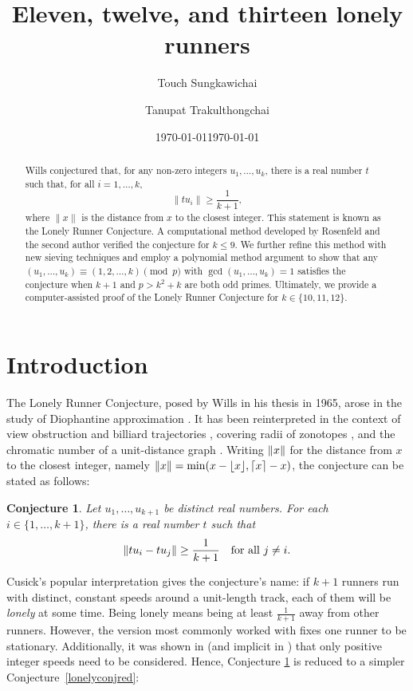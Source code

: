 \documentclass[11pt]{amsart}
\title{Eleven, twelve, and thirteen lonely runners}
\author[T. Sungkawichai]{Touch Sungkawichai}
\date{\today}
\author[T. Trakulthongchai]{Tanupat Trakulthongchai}
\date{\today}
\DeclarePairedDelimiter\norm{\lVert}{\rVert}
\newtheorem{conjecture}[theorem]{Conjecture}
\theoremstyle{definition}
\theoremstyle{remark}
\begin{document}
\begin{abstract}
    Wills conjectured that, for any non-zero integers $u_1,\ldots,u_k$, 
    there is a real number $t$ such that, for all $i=1,\ldots,k$, \[\lVert tu_i\rVert\geq\frac{1}{k+1},\] 
    where $\lVert x\rVert$ is the distance from $x$ to the closest integer. This statement is known as the Lonely Runner Conjecture.
    A computational method developed by Rosenfeld and the second author verified the conjecture for $k\leq9$.
    We further refine this method with new sieving techniques and employ a polynomial method argument to show that
    any $(u_1,\ldots,u_k)\equiv(1,2,\ldots,k)\pmod{p}$ with $\gcd(u_1,\ldots,u_k)=1$ satisfies the conjecture when $k+1$ and $p > k^2+k$ 
    are both odd primes. Ultimately, we provide a computer-assisted proof of the Lonely Runner Conjecture for $k\in\{10,11,12\}$.
\end{abstract}
\maketitle

\section{Introduction}
The Lonely Runner Conjecture, posed by Wills in his thesis \cite{wills1965zwei} in 1965, arose in the study of Diophantine approximation \cite{Wills}. It has been reinterpreted in the context of view obstruction and billiard trajectories 
\cite{cusick1984view}, covering radii of zonotopes \cite{henze_covering_2017}, and the chromatic number of a 
unit-distance graph \cite{zhu2002circular}. 
Writing $\norm{x}$ for the distance from $x$ to the closest integer, namely $\norm{x}=\min(x-\lfloor x\rfloor, \lceil x\rceil-x)$, 
the conjecture can be stated as follows:

\begin{conjecture} \label{lonelyconj}
  Let $u_1, \ldots,u_{k+1}$ be distinct real numbers. For each $i \in\{1,\ldots,k+1\}$, there is a real number $t$ such that
  \[ \norm{t u_i-tu_j} \ge \frac{1}{k+1} \quad \text{for all } j \ne i. \]
\end{conjecture}

Cusick's \cite{bienia1998flows} popular interpretation gives the conjecture's name: if $k+1$ runners run with distinct,
constant speeds around a unit-length track, each of them will be \emph{lonely} at some time. 
Being lonely means being at least $\tfrac{1}{k+1}$ away from other runners. 
However, the version most commonly worked with fixes one runner to be stationary. 
Additionally, it was shown in \cite{Bohman,henze_covering_2017} (and implicit in \cite{wills1968simultanen,fourrunners}) that only positive integer speeds need to be considered. Hence, Conjecture \ref{lonelyconj} is reduced
to a simpler Conjecture~\ref{lonelyconjred}:
\end{document}
